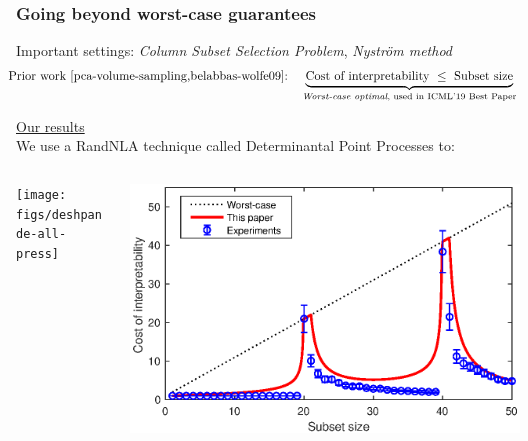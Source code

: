 \documentclass[10pt,handout]{beamer}
\begin{document}
\begin{frame}
  \frametitle{Going beyond worst-case guarantees}
  Important settings: \textit{Column Subset Selection Problem},
  \textit{Nystr\"om method}
  \begin{align*}
\hspace{-3mm}\text{Prior work \cite{pca-volume-sampling,belabbas-wolfe09}:}\quad
    \underbrace{\text{Cost of interpretability}\ 
\leq\  \text{Subset size}}_{\text{\textit{Worst-case optimal}, used in ICML'19
    Best Paper}} %
  \end{align*}  
\vspace{4mm}

\underline{Our results}\\
We use a RandNLA technique called Determinantal Point Processes to:
  \vspace{5mm}

 \begin{columns}
   \hspace{-3mm}\begin{column}{.48\textwidth}
     \centering
{}

\texttt{[image: figs/deshpande-all-press]}
\end{column}
\begin{column}{.48\textwidth}

  \includegraphics[width=1.05\textwidth]{figs/nystrom-bounds-press}
\end{column}
\end{columns}

\end{frame}
\end{document}
